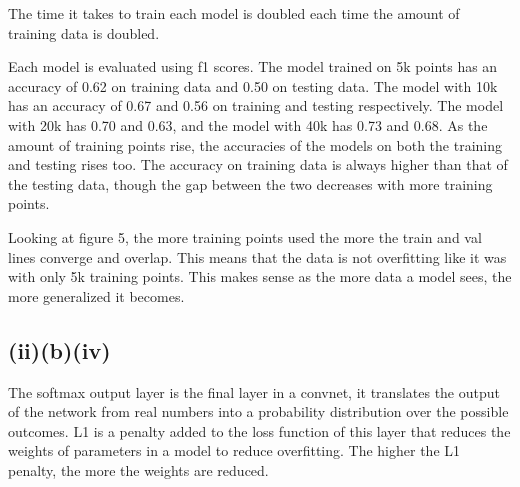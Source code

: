 \documentclass{article}
\begin{document}
The time it takes to train each model is doubled each time the amount of training data is doubled.

Each model is evaluated using f1 scores. The model trained on 5k points has an accuracy of 0.62 on training data and 0.50 on testing data. The model with 10k has an accuracy of 0.67 and 0.56 on training and testing respectively. The model with 20k has 0.70 and 0.63, and the model with 40k has 0.73 and 0.68. As the amount of training points rise, the accuracies of the models on both the training and testing rises too. The accuracy on training data is always higher than that of the testing data, though the gap between the two decreases with more training points.

Looking at figure 5, the more training points used the more the train and val lines converge and overlap. This means that the data is not overfitting like it was with only 5k training points. This makes sense as the more data a model sees, the more generalized it becomes.  

\subsection{(ii)(b)(iv)}

The softmax output layer is the final layer in a convnet, it translates the output of the network from real numbers into a probability distribution over the possible outcomes. L1 is a penalty added to the loss function of this layer that reduces the weights of parameters in a model to reduce overfitting. The higher the L1 penalty, the more the weights are reduced. 
\end{document}
